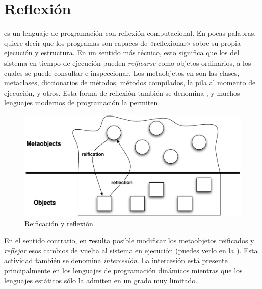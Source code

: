 \documentclass[a4paper,10pt,twoside]{book}
\begin{document}
        \sloppy
\fi

\chapter{Reflexión}

\st es un lenguaje de programación con reflexión computacional.
En pocas palabras, quiere decir que los programas son capaces de
«reflexionar» sobre su propia ejecución y estructura.
En un sentido más técnico, esto significa que
los  del sistema en tiempo de ejecución
pueden \emph{reificarse} como objetos ordinarios, a los cuales se
puede consultar e inspeccionar.  Los metaobjetos en \st son las
clases, metaclases, diccionarios de métodos, métodos compilados, la
pila al momento de ejecución, y otros.  Esta forma de reflexión
también se denomina , y muchos lenguajes
modernos de programación la permiten.

\begin{figure}[ht]\centering
        \includegraphics[width=\linewidth]{reflect}
        \caption{Reificación y reflexión.} %
\end{figure}

En el sentido contrario, en \st resulta posible modificar los
metaobjetos reificados y \emph{reflejar} esos cambios de vuelta al
sistema en ejecución (puedes verlo en la ).  Esta
actividad también se denomina \emph{intercesión}. La intercesión está
presente principalmente en los lenguajes de programación dinámicos
mientras que los lenguajes estáticos sólo la admiten en un grado muy
limitado.
\end{document}
